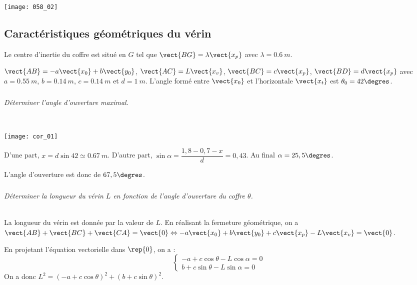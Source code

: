
\begin{center}
\texttt{[image: 058\_02]}
\end{center}
\fi


\subsection*{Caractéristiques géométriques du vérin}
\ifprof
\else
Le centre d’inertie du coffre est situé en $G$ tel que $\vect{BG}=\lambda\vect{x_p}$ avec $\lambda=\SI{0,6}{m}$.

$\vect{AB}=-a\vect{x_0}+b\vect{y_0}$, $\vect{AC}=L\vect{x_v}$, $\vect{BC}=c\vect{x_p}$, $\vect{BD}=d\vect{x_p}$ avec $a=\SI{0,55}{m}$, $b=\SI{0,14}{m}$, $c=\SI{0,14}{m}$  et $d=\SI{1}{m}$. L’angle formé entre $\vect{x_0}$ et l’horizontale $\vect{x_t}$ est $\theta_0 = 42\degres$.
\fi

\subparagraph{}
\textit{Déterminer l’angle d’ouverture maximal.}
\ifprof
\begin{corrige}~\\
\begin{center}
\texttt{[image: cor\_01]}
\end{center}
D'une part, $x = d\sin 42 \simeq \SI{0,67}{m}$. D'autre part, $\sin\alpha = \dfrac{1,8-0,7-x}{d}=0,43$. Au final $\alpha = 25,5\degres$. 

L'angle d'ouverture est donc de $67,5\degres$.

\end{corrige}
\else
\fi


\subparagraph{}
\textit{Déterminer la longueur du vérin $L$ en fonction de l’angle d’ouverture du coffre $\theta$.}
\ifprof
\begin{corrige}~\\
La longueur du vérin est donnée par la valeur de $L$. En réalisant la fermeture géométrique, on a $\vect{AB}+\vect{BC}+\vect{CA}=\vect{0} \Leftrightarrow 
-a\vect{x_0}+b\vect{y_0} + c\vect{x_p} -L\vect{x_v} =\vect{0}$.

En projetant l'équation vectorielle dans $\rep{0}$, on a : 
$$
\left\{ 
\begin{array}{l}
-a + c\cos\theta -L\cos\alpha ={0} \\
b + c\sin\theta -L\sin\alpha ={0}
\end{array}
\right.
$$
On a donc $L^2 =\left(-a + c\cos\theta \right)^2 + \left(b + c\sin\theta \right)^2  $.

\end{corrige}
\else
\fi

